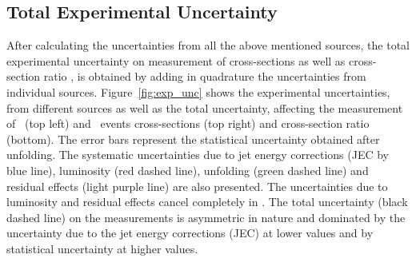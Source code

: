 \subsection{Total Experimental Uncertainty}
After calculating the uncertainties from all the above mentioned sources, the total experimental uncertainty on measurement of cross-sections as well as cross-section ratio \rations, is obtained by adding in quadrature the uncertainties from individual sources. Figure~\ref{fig:exp_unc} shows the experimental uncertainties, from different sources as well as the total uncertainty, affecting the measurement of \njt~(top left) and \njth~events cross-sections (top right) and cross-section ratio \ratio (bottom). The error bars represent the statistical uncertainty obtained after unfolding. The systematic uncertainties due to jet energy corrections (JEC by blue line), luminosity (red dashed line), unfolding (green dashed line) and residual effects (light purple line) are also presented. The uncertainties due to luminosity and residual effects cancel completely in \ratio. The total uncertainty (black dashed line) on the measurements is asymmetric in nature and dominated by the uncertainty due to the jet energy corrections (JEC) at lower \httwo values and by statistical uncertainty at higher \httwo values. 
